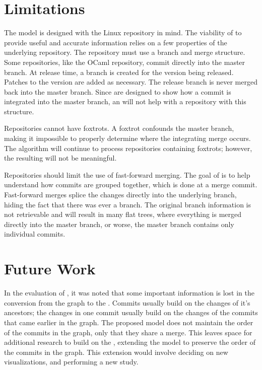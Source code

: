\section{Limitations}\label{sec:limitations}

The model is designed with the Linux repository in mind. The viability
of  to provide useful and accurate information relies on a few
properties of the underlying repository. The repository must use a
branch and merge structure. Some repositories, like the OCaml
repository, commit directly into the master branch. At release time, a
branch is created for the version being released. Patches to the version
are added as necessary. The release branch is never merged back into the
master branch. Since  are designed to show how a commit is
integrated into the master branch, an \mt{} will not help with a
repository with this structure.

Repositories cannot have foxtrots. A foxtrot confounds the master
branch, making it impossible to properly determine where the integrating
merge occurs. The algorithm will continue to process repositories
containing foxtrots; however, the resulting  will not be
meaningful.

Repositories should limit the use of fast-forward merging. The goal of
 is to help understand how commits are grouped together, which is
done at a merge commit. Fast-forward merges splice the changes directly
into the underlying branch, hiding the fact that there was ever a
branch. The original branch information is not retrievable and will
result in many flat trees, where everything is merged directly into the
master branch, or worse, the master branch contains only individual
commits.

\section{Future Work}\label{sec:future_work}

In the evaluation of \tool{}, it was noted that some important
information is lost in the conversion from the graph to the \mt{}.
Commits usually build on the changes of it's ancestors;
the changes in one commit usually build on the changes of the commits
that came earlier in the graph.
The proposed \mt{} model does not maintain the order of the commits in
the graph, only that they share a merge.
This leaves space for additional research to build on the \mt{},
extending the model to preserve the order of the commits in the graph.
This extension would involve deciding on new visualizations, and
performing a new study.

